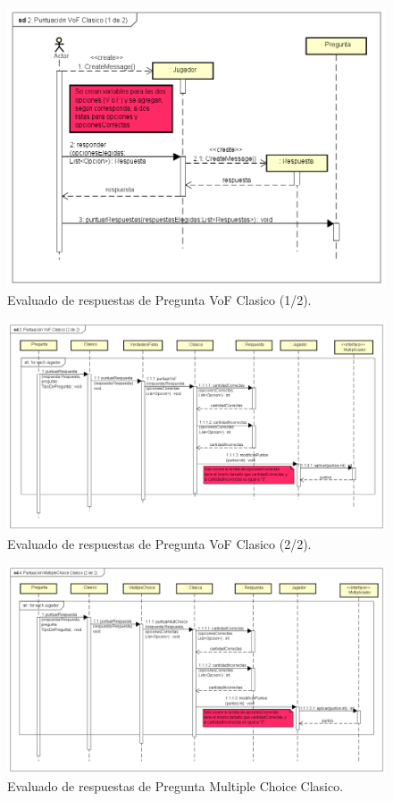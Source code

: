 \documentclass[titlepage,a4paper]{article}
\begin{document}
\begin{figure}[H]
\centering
\includegraphics[width=1\textwidth]{img/UMLSeq3.png}
\caption{\label{fig:class01}Evaluado de respuestas de Pregunta VoF Clasico (1/2).}
\end{figure}

\begin{figure}[H]
\centering
\includegraphics[width=1\textwidth]{img/UMLSeq4.png}
\caption{\label{fig:class01}Evaluado de respuestas de Pregunta VoF Clasico (2/2).}
\end{figure}

\begin{figure}[H]
\centering
\includegraphics[width=1\textwidth]{img/UMLSeq5.png}
\caption{\label{fig:class01}Evaluado de respuestas de Pregunta Multiple Choice Clasico.}
\end{figure}
\end{document}
